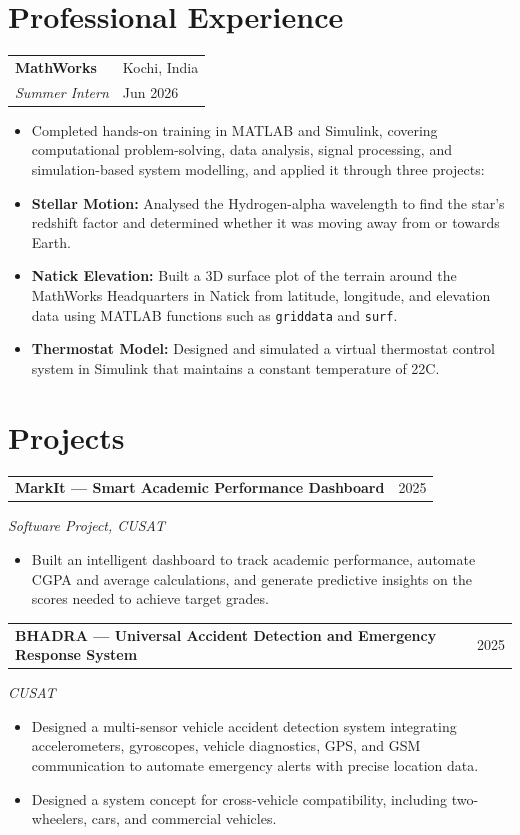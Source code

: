 \documentclass[10pt,a4paper]{extarticle}
\makeatletter
\newcommand{\entry}[4]{%
  \begin{tabularx}{\textwidth}{@{}X>{\raggedleft\arraybackslash}p{4.2cm}@{}}
    \textbf{#1} & \textcolor{muted}{#2}\\[-1pt]
    \textit{#3} & {\textcolor{muted}{#4}}
  \end{tabularx}\vspace{-2pt}
}
\newcommand{\project}[3]{%
  \begin{tabularx}{\textwidth}{@{}X>{\raggedleft\arraybackslash}p{1.1cm}@{}}
    \textbf{#1} & \textcolor{muted}{#2}
  \end{tabularx}
  {\textit{\textcolor{muted}{#3}}}\vspace{-2pt}
}
\makeatother
\begin{document}
\section{Professional Experience}
\entry{MathWorks}{Kochi, India}{Summer Intern}{Jun 2026}
\begin{itemize}
  \item Completed hands-on training in MATLAB and Simulink, covering computational problem-solving, data analysis, signal processing, and simulation-based system modelling, and applied it through three projects:
  \item \textbf{Stellar Motion:} Analysed the Hydrogen-alpha wavelength to find the star's redshift factor and determined whether it was moving away from or towards Earth.
  \item \textbf{Natick Elevation:} Built a 3D surface plot of the terrain around the MathWorks Headquarters in Natick from latitude, longitude, and elevation data using MATLAB functions such as \texttt{griddata} and \texttt{surf}.
  \item \textbf{Thermostat Model:} Designed and simulated a virtual thermostat control system in Simulink that maintains a constant temperature of 22\textdegree{}C.
\end{itemize}



\section{Projects}
\project{MarkIt --- Smart Academic Performance Dashboard  }{2025}{Software Project, CUSAT}
\begin{itemize}
  \item Built an intelligent dashboard to track academic performance, automate CGPA and average calculations, and generate predictive insights on the scores needed to achieve target grades. 
\end{itemize}
\vspace{5pt}
\project{BHADRA --- Universal Accident Detection and Emergency Response System  }{2025}{CUSAT}
\begin{itemize}
  \item Designed a multi-sensor vehicle accident detection system integrating accelerometers, gyroscopes, vehicle diagnostics, GPS, and GSM communication to automate emergency alerts with precise location data.
  \item Designed a system concept for cross-vehicle compatibility, including two-wheelers, cars, and commercial vehicles.
\end{itemize}
\vspace{5pt}
\end{document}
